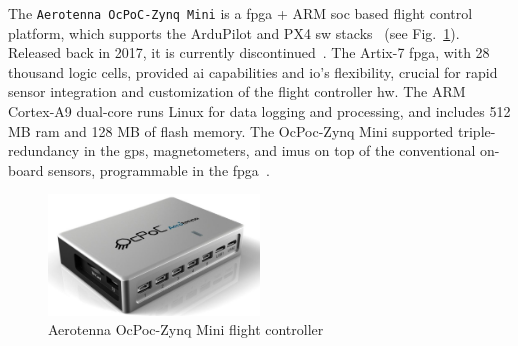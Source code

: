 %

The \lstinline{Aerotenna OcPoC-Zynq Mini} is a \gls{fpga} + ARM \gls{soc} based
  flight control platform,  which supports the ArduPilot and PX4 \gls{sw}
  stacks~\cite{ocpoc} (see Fig.~\ref{fig:hw-ocpoc}). Released back in 2017, it
  is currently discontinued~\cite{ocpoc-discontinued}.
  The Artix-7 \gls{fpga}, with 28 thousand logic cells, provided \gls{ai}
  capabilities and \gls{io}'s flexibility, crucial for rapid sensor integration
  and customization of the flight controller \gls{hw}. The ARM Cortex-A9
  dual-core runs Linux for data logging and processing, and includes 512 MB
  \gls{ram} and 128 MB of flash memory. The OcPoc-Zynq Mini supported
  triple-redundancy in the \gls{gps}, magnetometers, and \glspl{imu} on top of
  the conventional on-board sensors, programmable in the
  \gls{fpga}~\cite{ocpoc}.

\begin{figure}[!hbt]
  \centering
  \includegraphics[width=0.5\textwidth]{./img/png/hw-ocpoc-zynq-mini.png} 
  \caption[Aerotenna OcPoc-Zynq Mini flight controller]{Aerotenna OcPoc-Zynq Mini flight controller~\cite{ocpoc}\footnotemark}%
  \label{fig:hw-ocpoc}
\end{figure}
%
%


